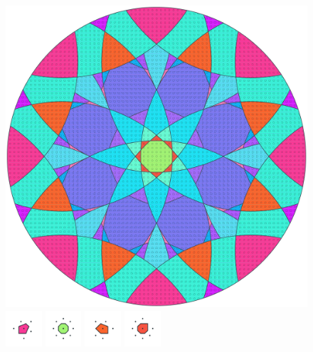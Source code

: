 \documentclass[text.tex]{subfiles}
\begin{document}
\clearpage
\pagestyle{fancy}
\fancyhf{}
\begin{figure}[h!]
\centering
\includegraphics[width=1\textwidth]{img/results/circle8/circle8_111810_(-2261_937alpha_1).pdf}
\includegraphics[width=0.12\textwidth]{img/results/circle8/circle8_111810_(-2261_937alpha_1)_001.pdf}
\includegraphics[width=0.12\textwidth]{img/results/circle8/circle8_111810_(-2261_937alpha_1)_002.pdf}
\includegraphics[width=0.12\textwidth]{img/results/circle8/circle8_111810_(-2261_937alpha_1)_003.pdf}
\includegraphics[width=0.12\textwidth]{img/results/circle8/circle8_111810_(-2261_937alpha_1)_004.pdf}

\end{figure}
\end{document}
